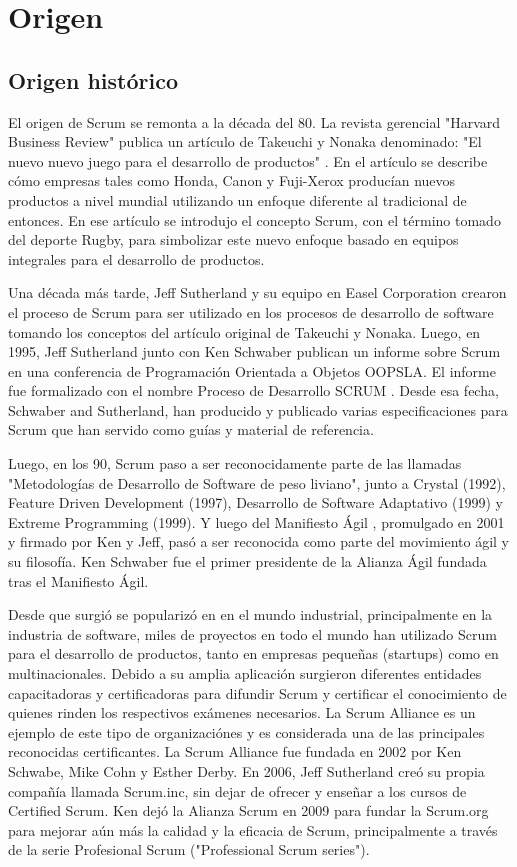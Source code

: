 \chapter{Origen}

\section{Origen histórico}

El origen de Scrum se remonta a la década del 80. La revista gerencial "Harvard Business Review" publica un artículo de Takeuchi y Nonaka denominado: "El nuevo nuevo juego para el desarrollo de productos" \cite{Takeuchi-Nonaka-1986}. En el artículo se describe cómo empresas tales como Honda, Canon y Fuji-Xerox producían nuevos productos a nivel mundial utilizando un enfoque diferente al tradicional de entonces. En ese artículo se introdujo el concepto Scrum, con el término tomado del deporte Rugby, para simbolizar este nuevo enfoque basado en equipos integrales para el desarrollo de productos.

Una década más tarde, Jeff Sutherland y su equipo en Easel Corporation crearon el proceso de Scrum para ser utilizado en los procesos de 
desarrollo de software tomando los conceptos del artículo original de Takeuchi y Nonaka. Luego, en 1995, Jeff Sutherland junto con Ken Schwaber publican un informe sobre Scrum en una conferencia de Programación Orientada a Objetos OOPSLA. El informe fue formalizado con el nombre Proceso de Desarrollo SCRUM \cite{Ken-Schwaber-1995}. Desde esa fecha, Schwaber and Sutherland, han producido y publicado varias especificaciones para Scrum que han servido como guías y material de referencia.

Luego, en los 90, Scrum paso a ser reconocidamente parte de las llamadas "Metodologías de Desarrollo de Software de peso liviano", junto a Crystal (1992), Feature Driven Development (1997), Desarrollo de Software Adaptativo (1999) y Extreme Programming (1999). Y luego del Manifiesto Ágil \cite{Beck-2001}, promulgado en 2001 y firmado por Ken y Jeff, pasó a ser reconocida como parte del movimiento ágil y su filosofía. Ken Schwaber fue el primer presidente de la Alianza Ágil fundada tras el Manifiesto Ágil.

Desde que surgió se popularizó en en el mundo industrial, principalmente en la industria de software, miles de proyectos en todo el mundo han utilizado Scrum para el desarrollo de productos, tanto en empresas pequeñas (startups) como en multinacionales. Debido a su amplia aplicación surgieron diferentes entidades capacitadoras y certificadoras para difundir Scrum y certificar el conocimiento de quienes rinden los respectivos exámenes necesarios. La Scrum Alliance \cite{Scrum-Alliance-2015} es un ejemplo de este tipo de organizaciónes y es considerada una de las principales reconocidas certificantes. La Scrum Alliance fue fundada en 2002 por Ken Schwabe, Mike Cohn y Esther Derby. En 2006, Jeff Sutherland creó su propia compañía llamada Scrum.inc, sin dejar de ofrecer y enseñar a los cursos de Certified Scrum.
Ken dejó la Alianza Scrum en 2009 para fundar la Scrum.org para mejorar aún más la calidad y la eficacia de Scrum, principalmente a través de la serie Profesional Scrum ("Professional Scrum series").

